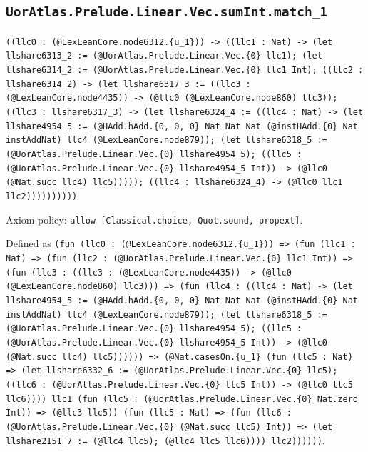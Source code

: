 \documentclass[11pt]{article}
\begin{document}
\subsection*{\texttt{UorAtlas.Prelude.Linear.Vec.sumInt.match\_1}}
\noindent\texttt{((llc0 : (@LexLeanCore.node6312.\{u\_1\})) -> ((llc1 : Nat) -> (let llshare6313\_2 := (@UorAtlas.Prelude.Linear.Vec.\{0\} llc1); (let llshare6314\_2 := (@UorAtlas.Prelude.Linear.Vec.\{0\} llc1 Int); ((llc2 : llshare6314\_2) -> (let llshare6317\_3 := ((llc3 : (@LexLeanCore.node4435)) -> (@llc0 (@LexLeanCore.node860) llc3)); ((llc3 : llshare6317\_3) -> (let llshare6324\_4 := ((llc4 : Nat) -> (let llshare4954\_5 := (@HAdd.hAdd.\{0, 0, 0\} Nat Nat Nat (@instHAdd.\{0\} Nat instAddNat) llc4 (@LexLeanCore.node879)); (let llshare6318\_5 := (@UorAtlas.Prelude.Linear.Vec.\{0\} llshare4954\_5); ((llc5 : (@UorAtlas.Prelude.Linear.Vec.\{0\} llshare4954\_5 Int)) -> (@llc0 (@Nat.succ llc4) llc5))))); ((llc4 : llshare6324\_4) -> (@llc0 llc1 llc2))))))))))}\par
\noindent Axiom policy: \texttt{allow [Classical.choice, Quot.sound, propext]}.\par
\noindent Defined as \texttt{(fun (llc0 : (@LexLeanCore.node6312.\{u\_1\})) => (fun (llc1 : Nat) => (fun (llc2 : (@UorAtlas.Prelude.Linear.Vec.\{0\} llc1 Int)) => (fun (llc3 : ((llc3 : (@LexLeanCore.node4435)) -> (@llc0 (@LexLeanCore.node860) llc3))) => (fun (llc4 : ((llc4 : Nat) -> (let llshare4954\_5 := (@HAdd.hAdd.\{0, 0, 0\} Nat Nat Nat (@instHAdd.\{0\} Nat instAddNat) llc4 (@LexLeanCore.node879)); (let llshare6318\_5 := (@UorAtlas.Prelude.Linear.Vec.\{0\} llshare4954\_5); ((llc5 : (@UorAtlas.Prelude.Linear.Vec.\{0\} llshare4954\_5 Int)) -> (@llc0 (@Nat.succ llc4) llc5)))))) => (@Nat.casesOn.\{u\_1\} (fun (llc5 : Nat) => (let llshare6332\_6 := (@UorAtlas.Prelude.Linear.Vec.\{0\} llc5); ((llc6 : (@UorAtlas.Prelude.Linear.Vec.\{0\} llc5 Int)) -> (@llc0 llc5 llc6)))) llc1 (fun (llc5 : (@UorAtlas.Prelude.Linear.Vec.\{0\} Nat.zero Int)) => (@llc3 llc5)) (fun (llc5 : Nat) => (fun (llc6 : (@UorAtlas.Prelude.Linear.Vec.\{0\} (@Nat.succ llc5) Int)) => (let llshare2151\_7 := (@llc4 llc5); (@llc4 llc5 llc6)))) llc2))))))}.\par
\end{document}

